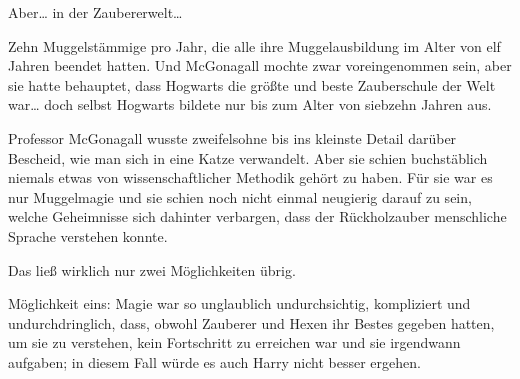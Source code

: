 Aber… in der Zaubererwelt…

Zehn Muggelstämmige pro Jahr, die alle ihre Muggelausbildung im Alter von elf Jahren beendet hatten. Und McGonagall mochte zwar voreingenommen sein, aber sie hatte behauptet, dass Hogwarts die größte und beste Zauberschule der Welt war… doch selbst Hogwarts bildete nur bis zum Alter von siebzehn Jahren aus.

Professor McGonagall wusste zweifelsohne bis ins kleinste Detail darüber Bescheid, wie man sich in eine Katze verwandelt. Aber sie schien buchstäblich niemals etwas von wissenschaftlicher Methodik gehört zu haben. Für sie war es nur Muggelmagie und sie schien noch nicht einmal neugierig darauf zu sein, welche Geheimnisse sich dahinter verbargen, dass der Rückholzauber menschliche Sprache verstehen konnte.

Das ließ wirklich nur zwei Möglichkeiten übrig.

Möglichkeit eins: Magie war so unglaublich undurchsichtig, kompliziert und undurchdringlich, dass, obwohl Zauberer und Hexen ihr Bestes gegeben hatten, um sie zu verstehen, kein Fortschritt zu erreichen war und sie irgendwann aufgaben; in diesem Fall würde es auch Harry nicht besser ergehen.

